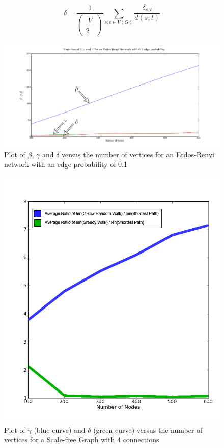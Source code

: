 \documentclass[10pt, conference, compsocconf]{IEEEtran}
\begin{document}

$$\delta = \frac{1}{\left(\begin{array}{c} |V|\\ 2\end{array}\right)} 
\sum_{s,t \in V(G)} \frac{\delta_{s,t}}{d(s,t)}$$

\begin{figure}[htp!]
\centering
\includegraphics[scale=0.2]{Results/WalkComparisonErdos10.png}
\caption{Plot of $\beta$, $\gamma$ and $\delta$ 
versus the number of vertices for an Erdos-Renyi network with an edge probability of 0.1}
\label{4_performance_er}
\end{figure}

\begin{figure}[htp!]
\centering
\includegraphics[width=.19\textheight]{Results/barabasi4connections2raw.jpg}
\caption{Plot of $\gamma$ (blue curve) and $\delta$ (green curve) versus the number of vertices for a Scale-free Graph with 4 connections}
\label{4_performance_ba_zoom}
\end{figure}
\end{document}
